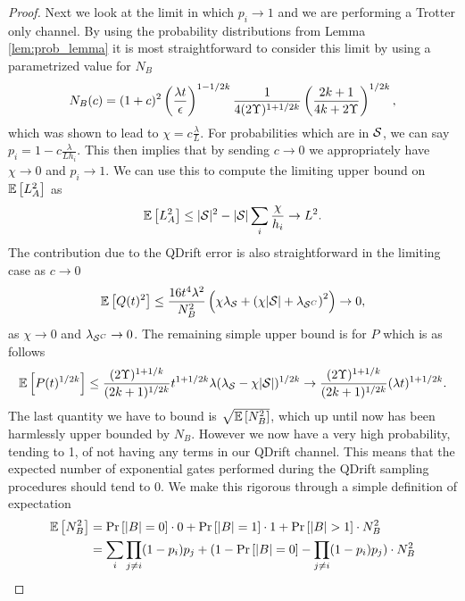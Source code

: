 \begin{proof}
Next we look at the limit in which $p_i \to 1$ and we are performing a Trotter only channel. By using the probability distributions from Lemma \ref{lem:prob_lemma} it is most straightforward to consider this limit by using a parametrized value for $N_B$ 
\begin{equation}
    N_B(c) = (1 + c)^2 \left( \frac{\lambda t}{\epsilon} \right)^{1 - 1/2k} \frac{1}{4(2 \Upsilon)^{1 + 1/2k}} \left( \frac{2k + 1}{4k + 2 \Upsilon} \right)^{1/2k},
\end{equation}
which was shown to lead to $\chi = c \frac{\lambda}{L}$. For probabilities which are in $\mathcal{S}$, we can say $p_i = 1 - c \frac{\lambda}{L h_i}$. This then implies that by sending $c \to 0$ we appropriately have $\chi \to 0$ and $p_i \to 1$. We can use this to compute the limiting upper bound
on $\mathbb{E}\left[ L_A^2 \right]$ as 
\begin{equation}
    \mathbb{E}\left[ L_A^2 \right] \leq |\mathcal{S}|^2 - |\mathcal{S}| \sum_i \frac{\chi}{h_i} \to L^2. 
\end{equation}
The contribution due to the QDrift error is also straightforward in the limiting case as $c \to 0$
\begin{equation}
    \mathbb{E}\left[ Q(t)^2 \right] \leq \frac{16 t^4 \lambda^2}{N_B^2} \left( \chi \lambda_{\mathcal{S}} + \left( \chi |\mathcal{S}| + \lambda_{\mathcal{S}^C} \right)^2 \right) \to 0,
\end{equation}
as $\chi \to 0$ and $\lambda_{\mathcal{S}^C} \to 0$. The remaining simple upper bound is for $P$ which is as follows
\begin{equation}
    \mathbb{E}\left[ P(t)^{1/2k} \right] \leq \frac{(2 \Upsilon)^{1+1/k}}{(2k+1)^{1/2k}} t^{1+1/2k} \lambda (\lambda_{\mathcal{S}} - \chi |\mathcal{S}|)^{1/2k} \to \frac{(2 \Upsilon)^{1+1/k}}{(2k+1)^{1/2k}} (\lambda t)^{1+1/2k}.
\end{equation}
The last quantity we have to bound is $\sqrt{\mathbb{E}\left[ N_B^2 \right]}$, which up until now has been harmlessly upper bounded by $N_B$. However we now have a very high probability, tending to 1, of not having any terms in our QDrift channel. This means that the expected number of exponential gates performed during the QDrift sampling procedures should tend to 0. We make this rigorous through a simple definition of expectation
\begin{align}
    \expect{N_B^2} &= \prob{|B| = 0} \cdot 0 + \prob{|B| = 1} \cdot 1 + \prob{|B| > 1 } \cdot N_B^2 \\
    &= \sum_i \prod_{j \neq i} (1 - p_i) p_j + (1 - \prob{|B| = 0} - \prod_{j \neq i} (1 - p_i) p_j) \cdot N_B^2 \\

\end{align}
\end{proof}
